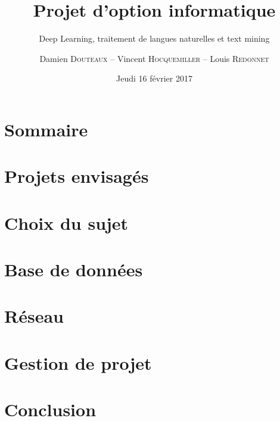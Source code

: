 \documentclass{beamer}
\title{Projet d'option informatique}
\subtitle{Deep Learning, traitement de langues naturelles et text mining}
\author{Damien \textsc{Douteaux} -- Vincent \textsc{Hocquemiller} -- Louis \textsc{Redonnet}}
\date{Jeudi 16 février 2017}
\begin{document}
\begin{frame}[plain]
	\titlepage
\end{frame}

\section{Sommaire}


\section{Projets envisagés}


\section{Choix du sujet}


\section{Base de données}


\section{Réseau}


\section{Gestion de projet}


\section{Conclusion}

\end{document}
